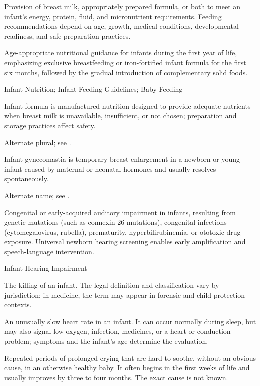  Provision of breast milk, appropriately prepared formula, or both to meet an infant's
energy, protein, fluid, and micronutrient requirements. Feeding recommendations depend
on age, growth, medical conditions, developmental readiness, and safe preparation
practices.

 Age-appropriate nutritional guidance for infants during the first year of life, emphasizing exclusive breastfeeding or iron-fortified infant formula for the first six months, followed by the gradual introduction of complementary solid foods.

\synonyms
Infant Nutrition; Infant Feeding Guidelines; Baby Feeding

 Infant formula is manufactured nutrition designed to provide adequate nutrients when breast milk is unavailable, insufficient, or not chosen; preparation and storage practices affect safety.

 Alternate plural; see .

 Infant gynecomastia is temporary breast enlargement in a newborn or young infant caused by maternal or neonatal hormones and usually resolves spontaneously.

 Alternate name; see .

 Congenital or early-acquired auditory impairment in infants, resulting from genetic mutations (such as connexin 26 mutations), congenital infections (cytomegalovirus, rubella), prematurity, hyperbilirubinemia, or ototoxic drug exposure. Universal newborn hearing screening enables early amplification and speech-language intervention.

\synonyms
Infant Hearing Impairment

 The killing of an infant. The legal definition and classification vary by jurisdiction; in medicine, the term may appear in forensic and child-protection contexts.

 An unusually slow heart rate in an infant. It can occur normally during sleep, but may also signal low oxygen, infection, medicines, or a heart or conduction problem; symptoms and the infant's age determine the evaluation.

 Repeated periods of prolonged crying that are hard to soothe, without an obvious cause, in an otherwise healthy baby. It often begins in the first weeks of life and usually improves by three to four months. The exact cause is not known.

